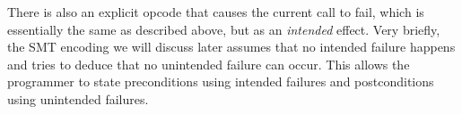 There is also an explicit opcode that causes the current call to fail, which is
essentially the same as described above, but as an \emph{intended} effect.
%
Very briefly, the SMT encoding we will discuss later assumes that no intended
failure happens and tries to deduce that no unintended failure can occur. This
allows the programmer to state preconditions using intended failures and
postconditions using unintended failures.
